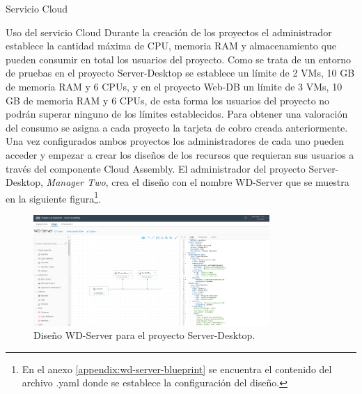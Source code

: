 \begin{subsection}{Servicio Cloud}
\begin{subsubsection}{Uso del servicio Cloud}
        \FloatBarrier
        Durante la creación de los proyectos el administrador establece la cantidad máxima de CPU, memoria RAM y almacenamiento que pueden consumir en total los usuarios del proyecto. Como se trata de un entorno de pruebas en el proyecto Server-Desktop se establece un límite de 2 VMs, 10 GB de memoria RAM y 6 CPUs, y en el proyecto Web-DB un límite de 3 VMs, 10 GB de memoria RAM y 6 CPUs, de esta forma los usuarios del proyecto no podrán superar ninguno de los límites establecidos. Para obtener una valoración del consumo se asigna a cada proyecto la tarjeta de cobro creada anteriormente.
        \\
        Una vez configurados ambos proyectos los administradores de cada uno pueden acceder y empezar a crear los diseños de los recursos que requieran sus usuarios a través del componente Cloud Assembly. El administrador del proyecto Server-Desktop, \textit{Manager Two}, crea el diseño con el nombre WD-Server que se muestra en la siguiente figura\footnote{En el anexo \ref{appendix:wd-server-blueprint} se encuentra el contenido del archivo .yaml donde se establece la configuración del diseño.}.
        \begin{figure}[h]
            \centering
            \includegraphics[width=0.8\textwidth]{imaxes/pruebaconcepto/vrealize/windows-centos-blueprint.png}
            \caption{Diseño WD-Server para el proyecto Server-Desktop.}
            \label{fig:server-desktop-blueprint}
        \end{figure}
        \FloatBarrier

\end{subsubsection}
\end{subsection}
